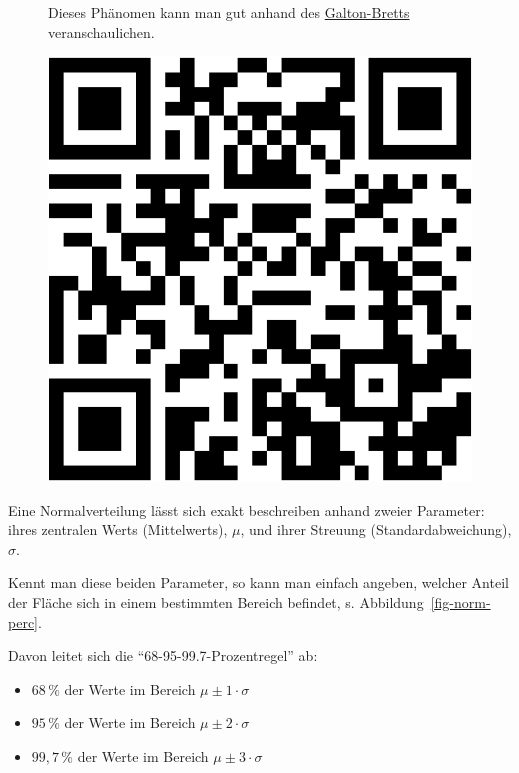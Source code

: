\documentclass[
  letterpaper,
]{scrbook}
\providecommand{\tightlist}{%
  \setlength{\itemsep}{0pt}\setlength{\parskip}{0pt}}\usepackage{longtable,booktabs,array}
\theoremstyle{definition}
\theoremstyle{definition}
\theoremstyle{definition}
\theoremstyle{remark}
\begin{document}
\begin{figure}

\begin{minipage}{0.80\linewidth}
Dieses Phänomen kann man gut anhand des
\href{https://www.youtube.com/watch?v=3m4bxse2JEQ}{Galton-Bretts}
veranschaulichen.\end{minipage}%
%
\begin{minipage}{0.20\linewidth}

\begin{center}
\includegraphics[width=0.75\linewidth,height=\textheight,keepaspectratio]{040-verbildlichen_files/figure-pdf/unnamed-chunk-16-1.pdf}
\end{center}

\end{minipage}%

\end{figure}%

Eine Normalverteilung lässt sich exakt beschreiben anhand zweier
Parameter: ihres zentralen Werts (Mittelwerts), \(\mu\), und ihrer
Streuung (Standardabweichung), \(\sigma\).

Kennt man diese beiden Parameter, so kann man einfach angeben, welcher
Anteil der Fläche sich in einem bestimmten Bereich befindet, s.
Abbildung~\ref{fig-norm-perc}.

Davon leitet sich die \enquote{68-95-99.7-Prozentregel} ab:

\begin{itemize}
\tightlist
\item
  \(68\,\%\) der Werte im Bereich \(\mu\pm 1 \cdot \sigma\)
\item
  \(95\,\%\) der Werte im Bereich \(\mu\pm 2 \cdot \sigma\)
\item
  \(99{,}7\,\%\) der Werte im Bereich \(\mu\pm 3 \cdot \sigma\)
\end{itemize}
\end{document}
